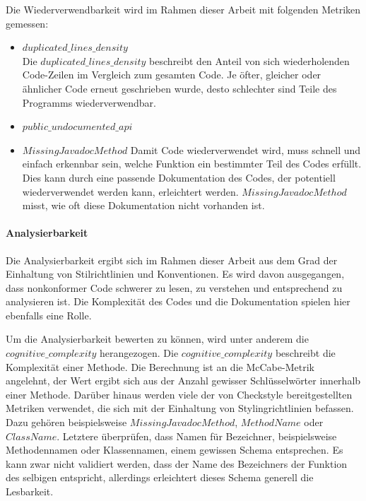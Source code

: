 \documentclass[
	oneside,  %
	ngerman, 
	final, 
	11pt, 
	a4paper, 
	1.1headlines, 
	headinclude=false, 
	footinclude=false, 
	mpinclude=false, 
	pagesize, 
	onecolumn, 
	titlepage, 
	parskip=half, 
	headsepline, 
	chapterprefix=false, 
	version=first, 
	listof=totoc, 
	bibliography=totoc, 
	toc=graduated, 
	fleqn
]{scrbook}
\begin{document}
Die Wiederverwendbarkeit wird im Rahmen dieser Arbeit mit folgenden Metriken gemessen:

\begin{itemize}
	\item $duplicated\_lines\_density$\\
	Die $duplicated\_lines\_density$ beschreibt den Anteil von sich wiederholenden Code-Zeilen im Vergleich zum gesamten Code.
	Je öfter, gleicher oder ähnlicher Code erneut geschrieben wurde, desto schlechter sind Teile des Programms wiederverwendbar.
	\item $public\_undocumented\_api$ %
	\item $MissingJavadocMethod$
	Damit Code wiederverwendet wird, muss schnell und einfach erkennbar sein, welche Funktion ein bestimmter Teil des Codes erfüllt.
	Dies kann durch eine passende Dokumentation des Codes, der potentiell wiederverwendet werden kann, erleichtert werden.
	$MissingJavadocMethod$ misst, wie oft diese Dokumentation nicht vorhanden ist. 
\end{itemize}

\paragraph{Analysierbarkeit}
Die Analysierbarkeit ergibt sich im Rahmen dieser Arbeit aus dem Grad der Einhaltung von Stilrichtlinien und Konventionen.
Es wird davon ausgegangen, dass nonkonformer Code schwerer zu lesen, zu verstehen und entsprechend zu analysieren ist.
Die Komplexität des Codes und die Dokumentation spielen hier ebenfalls eine Rolle.

Um die Analysierbarkeit bewerten zu können, wird unter anderem die \textit{$cognitive\_complexity$} herangezogen. 
Die \textit{$cognitive\_complexity$} beschreibt die Komplexität einer Methode.
Die Berechnung ist an die McCabe-Metrik angelehnt, der Wert ergibt sich aus der Anzahl gewisser Schlüsselwörter innerhalb einer Methode.
Darüber hinaus werden viele der von Checkstyle bereitgestellten Metriken verwendet, die sich mit der Einhaltung von Stylingrichtlinien befassen.
Dazu gehören beispielsweise \textit{$MissingJavadocMethod$}, \textit{$MethodName$} oder \textit{$ClassName$}.
Letztere überprüfen, dass Namen für Bezeichner, beispielsweise Methodennamen oder Klassennamen, einem gewissen Schema entsprechen.
Es kann zwar nicht validiert werden, dass der Name des Bezeichners der Funktion des selbigen entspricht, allerdings erleichtert dieses Schema generell die Lesbarkeit.
\end{document}
